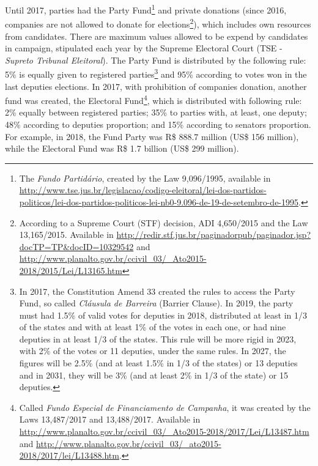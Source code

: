 \documentclass[
  12pt,
]{article}
\begin{document}
Until 2017, parties had the Party Fund\footnote{The \emph{Fundo
  Partidário}, created by the Law 9,096/1995, available in
  \url{http://www.tse.jus.br/legislacao/codigo-eleitoral/lei-dos-partidos-politicos/lei-dos-partidos-politicos-lei-nb0-9.096-de-19-de-setembro-de-1995}.}
and private donations (since 2016, companies are not allowed to donate
for elections\footnote{According to a Supreme Court (STF) decision, ADI
  4,650/2015 and the Law 13,165/2015. Available in
  \url{http://redir.stf.jus.br/paginadorpub/paginador.jsp?docTP=TP&docID=10329542}
  and
  \url{http://www.planalto.gov.br/ccivil_03/_Ato2015-2018/2015/Lei/L13165.htm}}),
which includes own resources from candidates. There are maximum values
allowed to be expend by candidates in campaign, stipulated each year by
the Supreme Electoral Court (TSE - \emph{Supreto Tribunal Eleitoral}).
The Party Fund is distributed by the following rule: 5\% is equally
given to registered parties\footnote{In 2017, the Constitution Amend 33
  created the rules to access the Party Fund, so called \emph{Cláusula
  de Barreira} (Barrier Clause). In 2019, the party must had 1.5\% of
  valid votes for deputies in 2018, distributed at least in 1/3 of the
  states and with at least 1\% of the votes in each one, or had nine
  deputies in at least 1/3 of the states. This rule will be more rigid
  in 2023, with 2\% of the votes or 11 deputies, under the same rules.
  In 2027, the figures will be 2.5\% (and at least 1.5\% in 1/3 of the
  states) or 13 deputies and in 2031, they will be 3\% (and at least 2\%
  in 1/3 of the state) or 15 deputies.} and 95\% according to votes won
in the last deputies elections. In 2017, with prohibition of companies
donation, another fund was created, the Electoral Fund\footnote{Called
  \emph{Fundo Especial de Financiamento de Campanha}, it was created by
  the Laws 13,487/2017 and 13,488/2017. Available in
  \url{http://www.planalto.gov.br/ccivil_03/_Ato2015-2018/2017/Lei/L13487.htm}
  and
  \url{http://www.planalto.gov.br/ccivil_03/_ato2015-2018/2017/lei/L13488.htm}.},
which is distributed with following rule: 2\% equally between registered
parties; 35\% to parties with, at least, one deputy; 48\% according to
deputies proportion; and 15\% according to senators proportion. For
example, in 2018, the Fund Party was R\$ 888.7 million (US\$ 156
million), while the Electoral Fund was R\$ 1.7 billion (US\$ 299
million).
\end{document}
